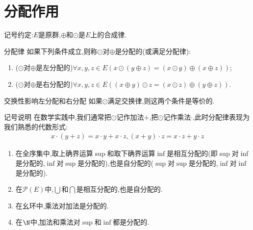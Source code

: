 \section{分配作用}

记号约定:$E$是原群,$\oplus$和$\odot$是$E$上的合成律.

\begin{definition}{分配律}{}
	如果下列条件成立,则称$\odot$对$\oplus$是分配的(或满足分配律):
	\begin{enumerate}
		\item ($\odot$对$\oplus$是左分配的)$\forall x,y,z\in E\left(x\odot\left(y\oplus z\right)=\left(x\odot y\right)\oplus\left(x\oplus z\right)\right)$;
		\item ($\odot$对$\oplus$是右分配的)$\forall x,y,z\in E\left(\left(x\oplus y\right)\odot z=\left(x\odot z\right)\oplus\left(y\oplus z\right)\right)$.
	\end{enumerate}
\end{definition}

\begin{remark}{交换性影响左分配和右分配}{}
	如果$\odot$满足交换律,则这两个条件是等价的.
\end{remark}

\begin{remark}{记号说明}{}
	在数学实践中,我们通常把$\odot$记作加法$+$,把$\odot$记作乘法$\cdot$,此时分配律表现为我们熟悉的代数形式:
	\begin{align*}
		x\cdot\left(y+z\right)=x\cdot y+x\cdot z,\left(x+y\right)\cdot z=x\cdot z+y\cdot z
	\end{align*}
\end{remark}

\begin{example}{}{}
	\begin{enumerate}
		\item 在全序集中,取上确界运算$\sup$和取下确界运算$\inf$是相互分配的(即$\sup$对$\inf$是分配的,$\inf$对$\sup$是分配的),也是自分配的($\sup$对$\sup$是分配的,$\inf$对$\inf$是分配的).
		\item 在$\mathcal{P}\left(E\right)$中,$\bigcup$和$\bigcap$是相互分配的,也是自分配的.
		\item 在幺环中,乘法对加法是分配的.
		\item 在$\N$中,加法和乘法对$\sup$和$\inf$都是分配的.
	\end{enumerate}
\end{example}